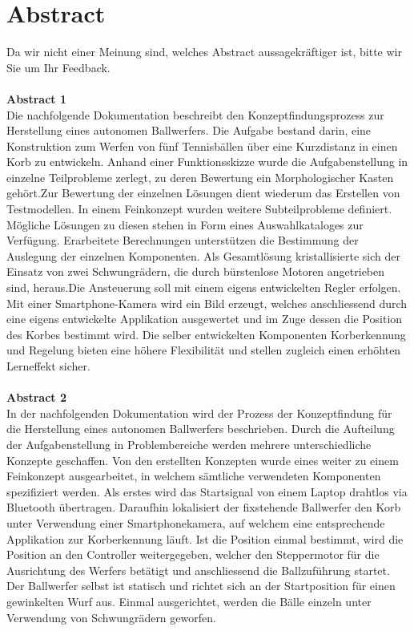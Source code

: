 \section*{Abstract}

Da wir nicht einer Meinung sind, welches Abstract aussagekräftiger ist, bitte wir Sie um Ihr Feedback.\\\\
\textbf{Abstract 1\\}
Die nachfolgende Dokumentation beschreibt den Konzeptfindungsprozess zur Herstellung eines autonomen Ballwerfers. Die Aufgabe bestand darin, eine Konstruktion zum Werfen von fünf Tennisbällen über eine Kurzdistanz in einen Korb zu entwickeln. Anhand einer Funktionsskizze wurde die Aufgabenstellung in einzelne Teilprobleme zerlegt, zu deren Bewertung ein Morphologischer Kasten gehört.Zur Bewertung der einzelnen Lösungen dient wiederum das Erstellen von Testmodellen. In einem Feinkonzept wurden weitere Subteilprobleme definiert. Mögliche Lösungen zu diesen stehen in Form eines Auswahlkataloges zur Verfügung. Erarbeitete Berechnungen unterstützen die Bestimmung der Auslegung der einzelnen Komponenten. Als Gesamtlösung kristallisierte sich der Einsatz von zwei Schwungrädern, die durch bürstenlose Motoren angetrieben sind, heraus.Die Ansteuerung soll mit einem eigens entwickelten Regler erfolgen. Mit einer Smartphone-Kamera wird ein Bild erzeugt, welches anschliessend durch eine eigens entwickelte Applikation ausgewertet und im Zuge dessen die Position des Korbes bestimmt wird. Die selber entwickelten Komponenten Korberkennung und Regelung bieten eine höhere Flexibilität und stellen zugleich einen erhöhten Lerneffekt sicher.\\\\
\textbf{Abstract 2\\}
In der nachfolgenden Dokumentation wird der Prozess der Konzeptfindung für die Herstellung eines autonomen Ballwerfers beschrieben. Durch die Aufteilung der Aufgabenstellung in Problembereiche werden mehrere unterschiedliche Konzepte geschaffen. Von den erstellten Konzepten wurde eines weiter zu einem Feinkonzept ausgearbeitet, in welchem sämtliche verwendeten Komponenten spezifiziert werden. Als erstes wird das Startsignal von einem Laptop drahtlos via Bluetooth übertragen. Daraufhin lokalisiert der fixstehende Ballwerfer den Korb unter Verwendung einer Smartphonekamera, auf welchem eine entsprechende Applikation zur Korberkennung läuft. Ist die Position einmal bestimmt, wird die Position an den Controller weitergegeben, welcher den Steppermotor für die Ausrichtung des Werfers betätigt und anschliessend die Ballzuführung startet. Der Ballwerfer selbst ist statisch und richtet sich an der Startposition für einen gewinkelten Wurf aus. Einmal ausgerichtet, werden die Bälle einzeln unter Verwendung von Schwungrädern geworfen.
